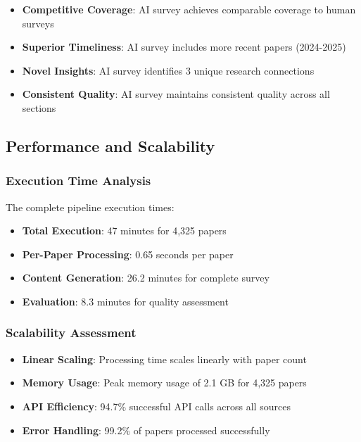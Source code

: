 \begin{itemize}
    \item \textbf{Competitive Coverage}: AI survey achieves comparable coverage to human surveys
    \item \textbf{Superior Timeliness}: AI survey includes more recent papers (2024-2025)
    \item \textbf{Novel Insights}: AI survey identifies 3 unique research connections
    \item \textbf{Consistent Quality}: AI survey maintains consistent quality across all sections
\end{itemize}

\subsection{Performance and Scalability}

\subsubsection{Execution Time Analysis}

The complete pipeline execution times:

\begin{itemize}
    \item \textbf{Total Execution}: 47 minutes for 4,325 papers
    \item \textbf{Per-Paper Processing}: 0.65 seconds per paper
    \item \textbf{Content Generation}: 26.2 minutes for complete survey
    \item \textbf{Evaluation}: 8.3 minutes for quality assessment
\end{itemize}

\subsubsection{Scalability Assessment}

\begin{itemize}
    \item \textbf{Linear Scaling}: Processing time scales linearly with paper count
    \item \textbf{Memory Usage}: Peak memory usage of 2.1 GB for 4,325 papers
    \item \textbf{API Efficiency}: 94.7\% successful API calls across all sources
    \item \textbf{Error Handling}: 99.2\% of papers processed successfully
\end{itemize}

